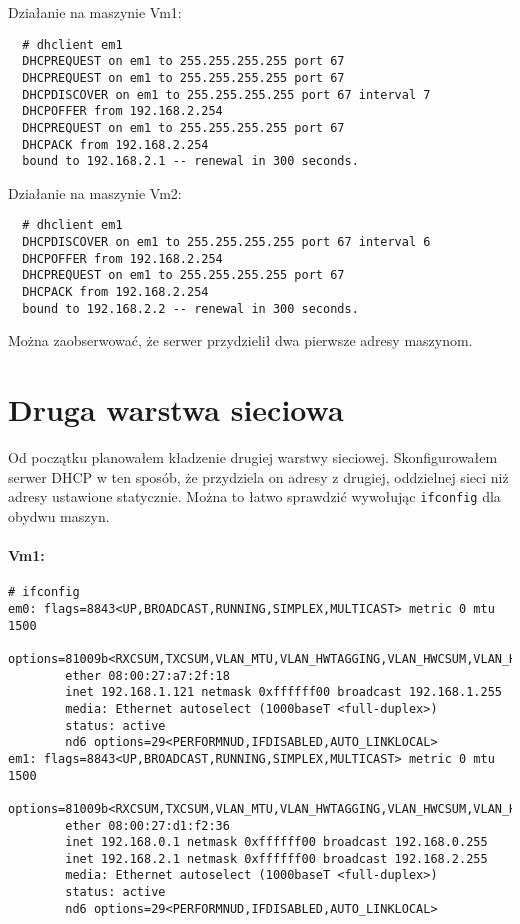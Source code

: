 \documentclass{mwart} %
\begin{document}
\vspace{2mm}
Działanie na maszynie Vm1:
\begin{verbatim}
  # dhclient em1
  DHCPREQUEST on em1 to 255.255.255.255 port 67
  DHCPREQUEST on em1 to 255.255.255.255 port 67
  DHCPDISCOVER on em1 to 255.255.255.255 port 67 interval 7
  DHCPOFFER from 192.168.2.254
  DHCPREQUEST on em1 to 255.255.255.255 port 67
  DHCPACK from 192.168.2.254
  bound to 192.168.2.1 -- renewal in 300 seconds.
\end{verbatim}

Działanie na maszynie Vm2:
\begin{verbatim}
  # dhclient em1
  DHCPDISCOVER on em1 to 255.255.255.255 port 67 interval 6
  DHCPOFFER from 192.168.2.254
  DHCPREQUEST on em1 to 255.255.255.255 port 67
  DHCPACK from 192.168.2.254
  bound to 192.168.2.2 -- renewal in 300 seconds.
\end{verbatim}

Można zaobserwować, że serwer przydzielił dwa pierwsze adresy maszynom.
 
\section{Druga warstwa sieciowa}
Od początku planowałem kładzenie drugiej warstwy sieciowej. Skonfigurowałem serwer DHCP w ten sposób, że przydziela on adresy z drugiej, oddzielnej sieci niż adresy ustawione statycznie. Można to łatwo sprawdzić wywołując \texttt{ifconfig} dla obydwu maszyn.

\paragraph{Vm1:}
\begin{verbatim}
# ifconfig
em0: flags=8843<UP,BROADCAST,RUNNING,SIMPLEX,MULTICAST> metric 0 mtu 1500
        options=81009b<RXCSUM,TXCSUM,VLAN_MTU,VLAN_HWTAGGING,VLAN_HWCSUM,VLAN_HWFILTER>
        ether 08:00:27:a7:2f:18
        inet 192.168.1.121 netmask 0xffffff00 broadcast 192.168.1.255
        media: Ethernet autoselect (1000baseT <full-duplex>)
        status: active
        nd6 options=29<PERFORMNUD,IFDISABLED,AUTO_LINKLOCAL>
em1: flags=8843<UP,BROADCAST,RUNNING,SIMPLEX,MULTICAST> metric 0 mtu 1500
        options=81009b<RXCSUM,TXCSUM,VLAN_MTU,VLAN_HWTAGGING,VLAN_HWCSUM,VLAN_HWFILTER>
        ether 08:00:27:d1:f2:36
        inet 192.168.0.1 netmask 0xffffff00 broadcast 192.168.0.255
        inet 192.168.2.1 netmask 0xffffff00 broadcast 192.168.2.255
        media: Ethernet autoselect (1000baseT <full-duplex>)
        status: active
        nd6 options=29<PERFORMNUD,IFDISABLED,AUTO_LINKLOCAL>
\end{verbatim}
\end{document}
